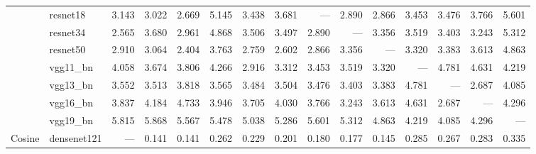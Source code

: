 \begin{table}
\begin{tabular}{llrrrrrrrrrrrrr}
       & resnet18 &                 3.143 &                 3.022 &                 2.669 &               5.145 &                   3.438 &                   3.681 &                --- &              2.890 &              2.866 &               3.453 &               3.476 &               3.766 &               5.601 \\
       & resnet34 &                 2.565 &                 3.680 &                 2.961 &               4.868 &                   3.506 &                   3.497 &              2.890 &                --- &              3.356 &               3.519 &               3.403 &               3.243 &               5.312 \\
       & resnet50 &                 2.910 &                 3.064 &                 2.404 &               3.763 &                   2.759 &                   2.602 &              2.866 &              3.356 &                --- &               3.320 &               3.383 &               3.613 &               4.863 \\
       & vgg11_bn &                 4.058 &                 3.674 &                 3.806 &               4.266 &                   2.916 &                   3.312 &              3.453 &              3.519 &              3.320 &                 --- &               4.781 &               4.631 &               4.219 \\
       & vgg13_bn &                 3.552 &                 3.513 &                 3.818 &               3.565 &                   3.484 &                   3.504 &              3.476 &              3.403 &              3.383 &               4.781 &                 --- &               2.687 &               4.085 \\
       & vgg16_bn &                 3.837 &                 4.184 &                 4.733 &               3.946 &                   3.705 &                   4.030 &              3.766 &              3.243 &              3.613 &               4.631 &               2.687 &                 --- &               4.296 \\
       & vgg19_bn &                 5.815 &                 5.868 &                 5.567 &               5.478 &                   5.038 &                   5.286 &              5.601 &              5.312 &              4.863 &               4.219 &               4.085 &               4.296 &                 --- \\
\cline{1-15}
\multirow{13}{*}{Cosine} & densenet121 &                   --- &                 0.141 &                 0.141 &               0.262 &                   0.229 &                   0.201 &              0.180 &              0.177 &              0.145 &               0.285 &               0.267 &               0.283 &               0.335 \\

\end{tabular}
\end{table}
